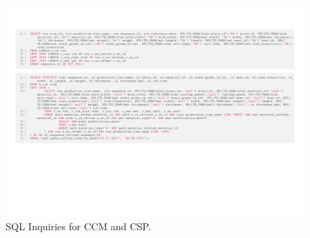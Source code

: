 \begin{landscape}
\begin{figure}[ht]
	\centering
	\hspace*{-2cm}
	\includegraphics[width=1.7\textwidth]{../database_inquiries/CCM_CSP.pdf}
	\vspace*{-6cm}
	\caption{SQL Inquiries for CCM and CSP.}
	\label{figure-supplements-CCM_CSP-SQL}
\end{figure}
\end{landscape}
